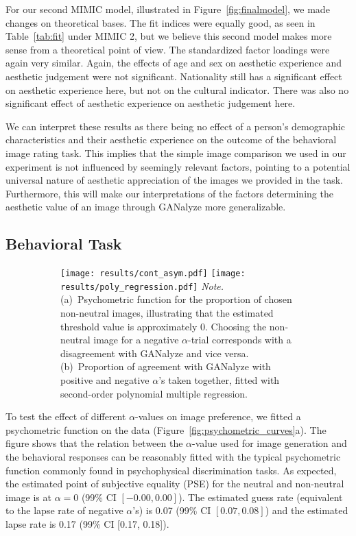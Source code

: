 \documentclass[../main.tex]{subfiles}
\begin{document}
For our second MIMIC model, illustrated in Figure~\ref{fig:finalmodel}, we made changes on theoretical bases. The fit indices were equally good, as seen in Table~\ref{tab:fit} under MIMIC 2, but we believe this second model makes more sense from a theoretical point of view. The standardized factor loadings were again very similar. Again, the effects of age and sex on aesthetic experience and aesthetic judgement were not significant. Nationality still has a significant effect on aesthetic experience here, but not on the cultural indicator. There was also no significant effect of aesthetic experience on aesthetic judgement here.



We can interpret these results as there being no effect of a person's demographic characteristics and their aesthetic experience on the outcome of the behavioral image rating task. This implies that the simple image comparison we used in our experiment is not influenced by seemingly relevant factors, pointing to a potential universal nature of aesthetic appreciation of the images we provided in the task. Furthermore, this will make our interpretations of the factors determining the aesthetic value of an image through GANalyze more generalizable.



\subsection{Behavioral Task}

\begin{figure}[!tb]
	\caption{Behavioral Results from the Image Rating Task}
	\label{fig:psychometric_curves}
	\centering
	\begin{subfigure}{\textwidth}
		{\centering
			\texttt{[image: results/cont\_asym.pdf]}
			\hfill
			\texttt{[image: results/poly\_regression.pdf]}}
		{\textit{Note.} (a)~Psychometric function for the proportion of chosen non-neutral images, illustrating that the estimated threshold value is approximately 0. Choosing the non-neutral image for a negative $\alpha$-trial corresponds with a disagreement with GANalyze and vice versa. (b)~Proportion of agreement with GANalyze with positive and negative $\alpha$'s taken together, fitted with second-order polynomial multiple regression.}
	\end{subfigure}
\end{figure}

To test the effect of different $\alpha$-values on image preference, we fitted a psychometric function on the data (Figure~\ref{fig:psychometric_curves}a). The figure shows that the relation between the $\alpha$-value used for image generation and the behavioral responses can be reasonably fitted with the typical psychometric function commonly found in psychophysical discrimination tasks. As expected, the estimated point of subjective equality (PSE) for the neutral and non-neutral image is at $\alpha = 0$ (99\% CI $[-0.00, 0.00]$). The estimated guess rate (equivalent to the lapse rate of negative $\alpha$'s) is 0.07 (99\% CI $[0.07, 0.08]$) and the estimated lapse rate is 0.17 (99\% CI [0.17, 0.18]).
\end{document}

